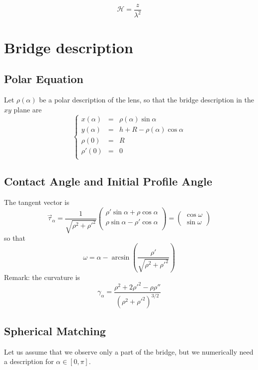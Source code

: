 \documentclass[aps,onecolumn]{revtex4}
\begin{document}
\begin{equation}
	\mathcal{H} = \dfrac{z}{\lambda^2}
\end{equation}

\section{Bridge description}
\subsection{Polar Equation}
Let $\rho(\alpha)$ be a polar description of the lens, so that the bridge description in the $xy$ plane are
\begin{equation}
	\left\lbrace
	\begin{array}{rcl}
	x(\alpha) & = & \rho(\alpha)\sin\alpha\\
	y(\alpha) & = & h + R - \rho(\alpha)\cos\alpha\\
	\rho(0)   & = & R\\
	\rho'(0)  & = & 0\\
	\end{array}
	\right.
\end{equation}

\subsection{Contact Angle and Initial Profile Angle}
The   tangent vector is
\begin{equation}
	\vec{\tau}_\alpha = 
	\dfrac{1}{\sqrt{\rho^2+\rho'^2}}
	\begin{pmatrix}
		\rho'\sin\alpha+\rho\cos\alpha\\
		\rho\sin\alpha - \rho'\cos\alpha\\
	\end{pmatrix}
 = 
 	\begin{pmatrix}
	\cos\omega\\
	\sin\omega
	\end{pmatrix}
\end{equation}
so that
\begin{equation}
	\label{eq:omega}
	\omega = \alpha - \arcsin\left(\dfrac{\rho'}{\sqrt{\rho^2+\rho'^2}}\right)
\end{equation}
Remark: the curvature is
\begin{equation}
	\gamma_\alpha = \dfrac{\rho^2 + 2\rho'^2 - \rho\rho''}{\left(\rho^2+\rho'^2\right)^{3/2}}
\end{equation}


\subsection{Spherical Matching}
Let us assume that we observe only a part of the bridge, but we numerically need
a description for $\alpha\in[0,\pi]$.\\
\end{document}
